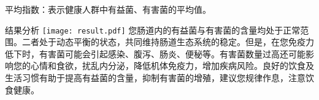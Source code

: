 \vspace*{3mm}

{\qihao 平均指数：表示健康人群中有益菌、有害菌的平均值。}

\vspace*{8mm}

\begin{spacing}{1.5}
\begin{LRaside}[.8]{结果分析}
\noindent
\texttt{[image: result.pdf]}
\asidebreak %
您肠道内的有益菌与有害菌的含量均处于正常范围。二者处于动态平衡的状态，共同维持肠道生态系统的稳定。但是，在您免疫力低下时，有害菌可能会引起感染、腹泻、肠炎、便秘等。有害菌数量过高还可能影响您的心情和食欲，扰乱内分泌，降低机体免疫力，增加疾病风险。良好的饮食及生活习惯有助于提高有益菌的含量，抑制有害菌的增殖，建议您规律作息，注意饮食健康。
\end{LRaside}
\end{spacing}


